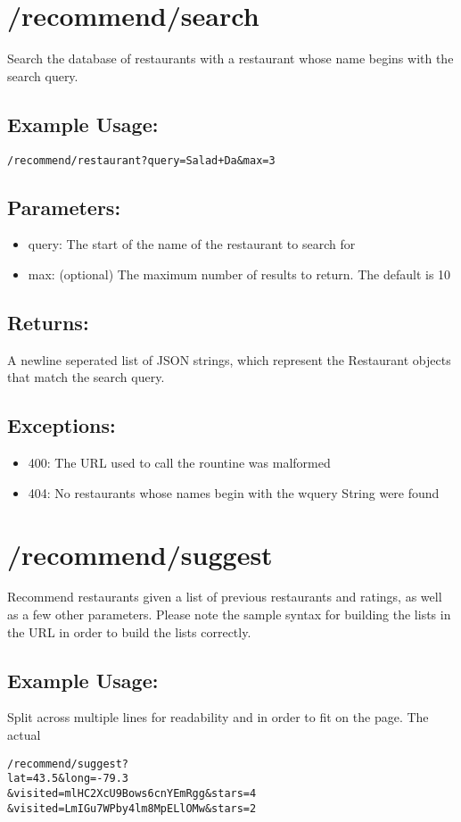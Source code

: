 \documentclass{article}
\begin{document}
\newpage

\section*{/recommend/search}
Search the database of restaurants with a restaurant whose name begins with
the search query.
\subsection*{Example Usage:}
\begin{verbatim}
/recommend/restaurant?query=Salad+Da&max=3
\end{verbatim}
\subsection*{Parameters:}
\begin{itemize}
  \item query: The start of the name of the restaurant to search for
  \item max: (optional) The maximum number of results to return. The default is 10
\end{itemize}
\subsection*{Returns:}
A newline seperated list of JSON strings, which represent the Restaurant objects
that match the search query.
\subsection*{Exceptions:}
\begin{itemize}
  \item 400: The URL used to call the rountine was malformed
  \item 404: No restaurants whose names begin with the wquery String were found
\end{itemize}

\newpage

\section*{/recommend/suggest}
Recommend restaurants given a list of previous restaurants and ratings, as well
as a few other parameters. Please note the sample syntax for building the lists
in the URL in order to build the lists correctly.
\subsection*{Example Usage:}
Split across multiple lines for readability and in order to fit on the page.
The actual 
\begin{verbatim}
/recommend/suggest?
lat=43.5&long=-79.3
&visited=mlHC2XcU9Bows6cnYEmRgg&stars=4
&visited=LmIGu7WPby4lm8MpELlOMw&stars=2
\end{verbatim}
\end{document}
